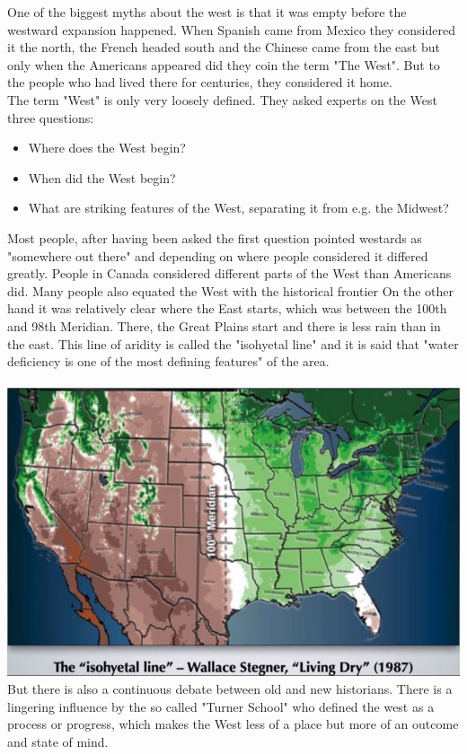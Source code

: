 \documentclass{article}
\begin{document}
	One of the biggest myths about the west is that it was empty before the westward expansion happened. When Spanish came from Mexico they considered it the north, the French headed south and the Chinese came from the east but only when the Americans appeared did they coin the term "The West". But to the people who had lived there for centuries, they considered it home. \\
	The term "West" is only very loosely defined. They asked experts on the West three questions:
	\begin{itemize}
		\item{Where does the West begin?}
		\item{When did the West begin?}
		\item{What are striking features of the West, separating it from e.g. the Midwest?}
	\end{itemize}
	Most people, after having been asked the first question pointed westards as "somewhere out there" and depending on where people considered it differed greatly. People in Canada considered different parts of the West than Americans did. Many people also equated the West with the historical frontier On the other hand it was relatively clear where the East starts, which was between the 100th and 98th Meridian. There, the Great Plains start and there is less rain than in the east. This line of aridity is called the "isohyetal line" and it is said that "water deficiency is one of the most defining features" of the area. \\ \\
	\includegraphics{isoyhetal_line.png} \\
	But there is also a continuous debate between old and new historians. There is a lingering influence by the so called "Turner School" who defined the west as a process or progress, which makes the West less of a place but more of an outcome and state of mind. \\
\end{document}
